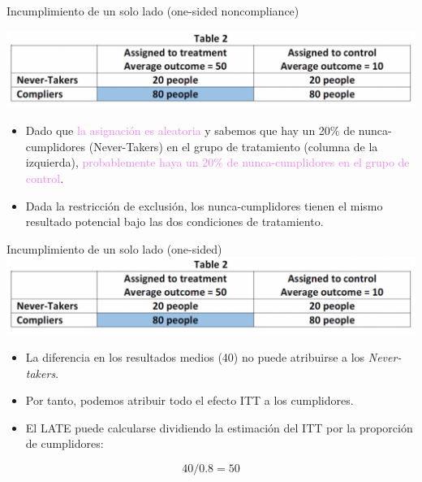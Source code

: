 \documentclass[
  ignorenonframetext,
]{beamer}
\providecommand{\tightlist}{%
  \setlength{\itemsep}{0pt}\setlength{\parskip}{0pt}}
\begin{document}
\begin{frame}{Incumplimiento de un solo lado (one-sided noncompliance)}
\protect\hypertarget{incumplimiento-de-un-solo-lado-one-sided-noncompliance-1}{}
\center

\includegraphics[width=1\textwidth,height=\textheight]{figs/compliers}

\begin{itemize}
\tightlist
\item
  Dado que \textcolor{violet}{la asignación es aleatoria} y sabemos que
  hay un 20\% de nunca-cumplidores (Never-Takers) en el grupo de
  tratamiento (columna de la izquierda),
  \textcolor{violet}{probablemente haya un 20\% de nunca-cumplidores en el grupo de control}.
  \pause
\item
  Dada la restricción de exclusión, los nunca-cumplidores tienen el
  mismo resultado potencial bajo las dos condiciones de tratamiento.
\end{itemize}
\end{frame}

\begin{frame}{Incumplimiento de un solo lado (one-sided)}
\protect\hypertarget{incumplimiento-de-un-solo-lado-one-sided}{}
\center \includegraphics[width=1\textwidth,height=\textheight]{figs/compliers}

\begin{itemize}
\tightlist
\item
  La diferencia en los resultados medios (40) no puede atribuirse a los
  \emph{Never-takers}.
\item
  Por tanto, podemos atribuir todo el efecto ITT a los cumplidores.
\item
  El LATE puede calcularse dividiendo la estimación del ITT por la
  proporción de cumplidores:
\end{itemize}

\[40/0.8 = 50\]
\end{frame}
\end{document}
